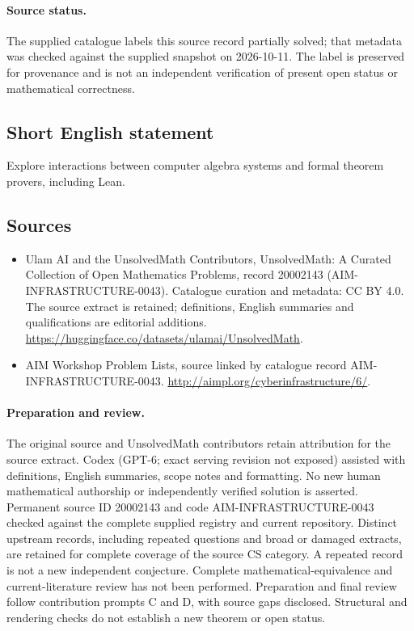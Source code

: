 \documentclass[11pt]{article}
\begin{document}
\paragraph{Source status.}
The supplied catalogue labels this source record partially solved; that metadata was checked against the supplied snapshot on 2026-10-11. The label is preserved for provenance and is not an independent verification of present open status or mathematical correctness.
\subsection{Short English statement}
Explore interactions between computer algebra systems and formal theorem provers, including Lean.
\subsection{Sources}
\begin{itemize}
\item[\hypertarget{source:20002143:1}{S1}] Ulam AI and the UnsolvedMath Contributors, UnsolvedMath: A Curated Collection of Open Mathematics Problems, record 20002143 (AIM-INFRASTRUCTURE-0043). Catalogue curation and metadata: CC BY 4.0. The source extract is retained; definitions, English summaries and qualifications are editorial additions.
\url{https://huggingface.co/datasets/ulamai/UnsolvedMath}.
\item[\hypertarget{source:20002143:2}{S2}] AIM Workshop Problem Lists, source linked by catalogue record AIM-INFRASTRUCTURE-0043.
\url{http://aimpl.org/cyberinfrastructure/6/}.
\end{itemize}
\paragraph{Preparation and review.}
The original source and UnsolvedMath contributors retain attribution for the source extract. Codex (GPT-6; exact serving revision not exposed) assisted with definitions, English summaries, scope notes and formatting. No new human mathematical authorship or independently verified solution is asserted. Permanent source ID 20002143 and code AIM-INFRASTRUCTURE-0043 checked against the complete supplied registry and current repository. Distinct upstream records, including repeated questions and broad or damaged extracts, are retained for complete coverage of the source CS category. A repeated record is not a new independent conjecture. Complete mathematical-equivalence and current-literature review has not been performed. Preparation and final review follow contribution prompts C and D, with source gaps disclosed. Structural and rendering checks do not establish a new theorem or open status.
\label{end:20002143}
\end{document}
